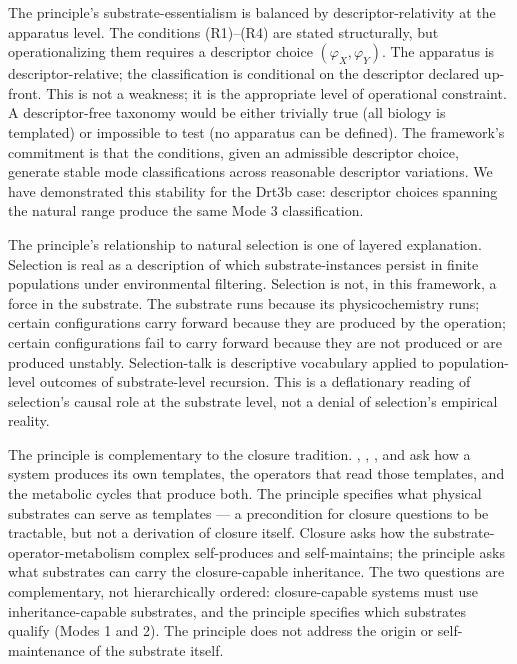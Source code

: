 \documentclass[aps,prx,reprint,amsmath,amssymb,floatfix,superscriptaddress,nofootinbib]{revtex4-2}
\theoremstyle{plain-thm}
\theoremstyle{definition-thm}
\newcommand{\descX}{\varphi_X}
\newcommand{\descY}{\varphi_Y}
\begin{document}
The principle's substrate-essentialism is balanced by descriptor-relativity at the apparatus level. The conditions (R1)--(R4) are stated structurally, but operationalizing them requires a descriptor choice $(\descX, \descY)$. The apparatus is descriptor-relative; the classification is conditional on the descriptor declared up-front. This is not a weakness; it is the appropriate level of operational constraint. A descriptor-free taxonomy would be either trivially true (all biology is templated) or impossible to test (no apparatus can be defined). The framework's commitment is that the conditions, given an admissible descriptor choice, generate stable mode classifications across reasonable descriptor variations. We have demonstrated this stability for the Drt3b case: descriptor choices spanning the natural range produce the same Mode 3 classification.

The principle's relationship to natural selection is one of layered explanation. Selection is real as a description of which substrate-instances persist in finite populations under environmental filtering. Selection is not, in this framework, a force in the substrate. The substrate runs because its physicochemistry runs; certain configurations carry forward because they are produced by the operation; certain configurations fail to carry forward because they are not produced or are produced unstably. Selection-talk is descriptive vocabulary applied to population-level outcomes of substrate-level recursion. This is a deflationary reading of selection's causal role at the substrate level, not a denial of selection's empirical reality.

The principle is complementary to the closure tradition. \citet{Rosen1958}, \citet{MaturanaVarela1972}, \citet{Pattee1972}, and \citet{Hofmeyr2017} ask how a system produces its own templates, the operators that read those templates, and the metabolic cycles that produce both. The principle specifies what physical substrates can serve as templates --- a precondition for closure questions to be tractable, but not a derivation of closure itself. Closure asks how the substrate-operator-metabolism complex self-produces and self-maintains; the principle asks what substrates can carry the closure-capable inheritance. The two questions are complementary, not hierarchically ordered: closure-capable systems must use inheritance-capable substrates, and the principle specifies which substrates qualify (Modes 1 and 2). The principle does not address the origin or self-maintenance of the substrate itself.
\end{document}

